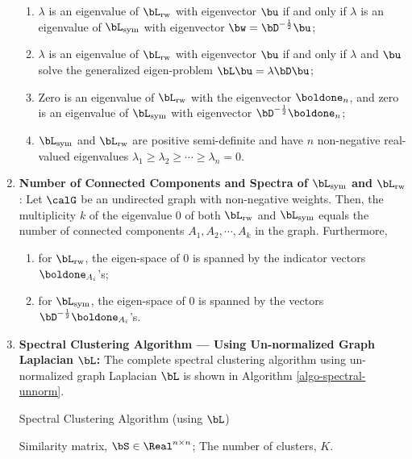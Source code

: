 \documentclass[12pt]{article}
\begin{document}
\begin{enumerate}[label=\textbf{\arabic*.}]
\begin{enumerate}
		\item $\lambda$ is an eigenvalue of $\bL_{\mathrm{rw}}$ with eigenvector $\bu$ if and only if $\lambda$ is an eigenvalue of $\bL_{\mathrm{sym}}$ with eigenvector $\bw = \bD^{-\frac{1}{2}} \bu$; 
		
		\item $\lambda$ is an eigenvalue of $\bL_{\mathrm{rw}}$ with eigenvector $\bu$ if and only if $\lambda$ and $\bu$ solve the generalized eigen-problem $\bL \bu = \lambda \bD \bu$; 
		
		\item Zero is an eigenvalue of $\bL_{\mathrm{rw}}$ with the eigenvector $\boldone_n$, and zero is an eigenvalue of $\bL_{\mathrm{sym}}$ with eigenvector $\bD^{- \frac{1}{2}} \boldone_n$; 
		
		\item $\bL_{\mathrm{sym}}$ and $\bL_{\mathrm{rw}}$ are positive semi-definite and have $n$ non-negative real-valued eigenvalues $\lambda_1 \ge \lambda_2 \ge \cdots \ge \lambda_n = 0$. 
	\end{enumerate}
	
	\item \textbf{Number of Connected Components and Spectra of $\bL_{\mathrm{sym}}$ and $\bL_{\mathrm{rw}}$}: Let $\calG$ be an undirected graph with non-negative weights. Then, the multiplicity $k$ of the eigenvalue 0 of both $\bL_{\mathrm{rw}}$ and $\bL_{\mathrm{sym}}$ equals the number of connected components $A_1, A_2, \cdots, A_k$ in the graph. Furthermore, 
	\begin{enumerate}
		\item for $\bL_{\mathrm{rw}}$, the eigen-space of 0 is spanned by the indicator vectors $\boldone_{A_i}$'s; 
		\item for $\bL_{\mathrm{sym}}$, the eigen-space of 0 is spanned by the vectors $\bD^{-\frac{1}{2}} \boldone_{A_i}$'s. 
	\end{enumerate}
	
	\item \textbf{Spectral Clustering Algorithm --- Using Un-normalized Graph Laplacian $\bL$:} The complete spectral clustering algorithm using un-normalized graph Laplacian $\bL$ is shown in Algorithm \ref{algo-spectral-unnorm}. 
	
	\begin{minipage}{\linewidth}
		\begin{algorithm}[H]
		\caption{Spectral Clustering Algorithm (using $\bL$)}\label{algo-spectral-unnorm}
			\begin{algorithmic}[1]
				\REQUIRE Similarity matrix, $\bS \in \Real^{n \times n}$; 
				\REQUIRE The number of clusters, $K$. 
				

\end{algorithmic}
\end{algorithm}
\end{minipage}
\end{enumerate}
\end{document}
